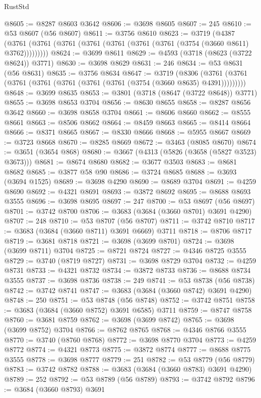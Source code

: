 \begin{lexlean}{RustStd}
\begin{coremodule}
@8605 := @8287 @8603 @3642
@8606 := @3698 @8605
@8607 := 245
@8610 := @53 @8607 (@56 @8607)
@8611 := @3756 @8610
@8623 := @3719
    (@4387 (@3761 (@3761 (@3761 (@3761 (@3761 (@3761 (@3761 (@3754 (@3660 @8611) @3762)))))))))
@8624 := @3699 @8611
@8629 := @4593 (@3718 (@8623 (@3722 @8624)) @3771)
@8630 := @3698 @8629
@8631 := 246
@8634 := @53 @8631 (@56 @8631)
@8635 := @3756 @8634
@8647 := @3719
    (@8306 (@3761 (@3761 (@3761 (@3761 (@3761 (@3761 (@3761 (@3754 (@3660 @8635) @4391)))))))))
@8648 := @3699 @8635
@8653 := @3801 (@3718 (@8647 (@3722 @8648)) @3771)
@8655 := @3698 @8653 @3704
@8656 := @8630 @8655
@8658 := @8287 @8656 @3642
@8660 := @3698 @8658 @3704
@8661 := @8606 @8660
@8662 := @8555 @8661
@8663 := @8506 @8662
@8664 := @8459 @8663
@8665 := @8414 @8664
@8666 := @8371 @8665
@8667 := @8330 @8666
@8668 := @5955 @8667
@8669 := @3723 @8668
@8670 := @8285 @8669
@8672 := @3463 (@8085 @8670)
@8674 := @3651 (@3654 @868)
@8680 := @3667 (@4313 (@5826 (@3658 (@5827 @3523) @3673)))
@8681 := @8674 @8680
@8682 := @3677 @3503
@8683 := @8681 @8682
@8685 := @3877 @58 @90
@8686 := @3724 @8685
@8688 := @3693 (@3694 @1525)
@8689 := @3698 @4290
@8690 := @8689 @3704
@8691 := @4259 @8690
@8692 := @4321 @8691
@8693 := @3872 @8692
@8695 := @8688 @8693 @3555
@8696 := @3698 @8695
@8697 := 247
@8700 := @53 @8697 (@56 @8697)
@8701 := @3742 @8700
@8706 := @3683 (@3684 (@3660 @8701) @3691 @4290)
@8707 := 248
@8710 := @53 @8707 (@56 @8707)
@8711 := @3742 @8710
@8717 := @3683 (@3684 (@3660 @8711) @3691 @6669) @3711
@8718 := @8706 @8717
@8719 := @3681 @8718
@8721 := @3698 (@3699 @8701)
@8724 := @3698 (@3699 @8711) @3704
@8725 := @8721 @8724
@8727 := @4346 @8725 @3555
@8729 := @3740 (@8719 @8727)
@8731 := @3698 @8729 @3704
@8732 := @4259 @8731
@8733 := @4321 @8732
@8734 := @3872 @8733
@8736 := @8688 @8734 @3555
@8737 := @3698 @8736
@8738 := 249
@8741 := @53 @8738 (@56 @8738)
@8742 := @3742 @8741
@8747 := @3683 (@3684 (@3660 @8742) @3691 @4290)
@8748 := 250
@8751 := @53 @8748 (@56 @8748)
@8752 := @3742 @8751
@8758 := @3683 (@3684 (@3660 @8752) @3691 @6585) @3711
@8759 := @8747 @8758
@8760 := @3681 @8759
@8762 := @3698 (@3699 @8742)
@8765 := @3698 (@3699 @8752) @3704
@8766 := @8762 @8765
@8768 := @4346 @8766 @3555
@8770 := @3740 (@8760 @8768)
@8772 := @3698 @8770 @3704
@8773 := @4259 @8772
@8774 := @4321 @8773
@8775 := @3872 @8774
@8777 := @8688 @8775 @3555
@8778 := @3698 @8777
@8779 := 251
@8782 := @53 @8779 (@56 @8779)
@8783 := @3742 @8782
@8788 := @3683 (@3684 (@3660 @8783) @3691 @4290)
@8789 := 252
@8792 := @53 @8789 (@56 @8789)
@8793 := @3742 @8792
@8796 := @3684 (@3660 @8793) @3691

\end{coremodule}
\end{lexlean}
